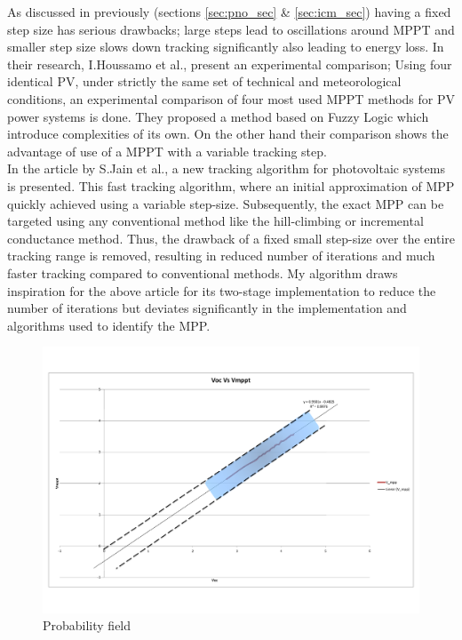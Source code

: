 As discussed in previously (sections \ref{sec:pno_sec} \& \ref{sec:icm_sec}) having a fixed step size has serious drawbacks; large steps lead to oscillations around \ac{MPPT} and smaller step size slows down tracking significantly also leading to energy loss. In their research, I.Houssamo et al.\cite{houssamo2013experimental}, present an experimental comparison; Using four identical PV, under strictly the same set of technical and meteorological conditions, an experimental comparison  of four most used MPPT methods for PV power systems is done. They  proposed a method based on Fuzzy Logic which introduce complexities of its own. On the other hand their comparison shows the advantage of use of a MPPT with a variable tracking step.\\  

In the article by S.Jain et al.\cite{jain2004new}, a new tracking algorithm for photovoltaic systems is presented. This  fast tracking algorithm, where an initial approximation of \ac{MPP} quickly achieved using a variable step-size. Subsequently, the exact \ac{MPP} can be targeted using any conventional method like the hill-climbing or incremental conductance method. Thus, the drawback of a fixed small step-size over the entire tracking range is removed, resulting in reduced number of iterations and much faster tracking compared to conventional methods. My algorithm draws inspiration for the above article for its two-stage implementation to reduce the number of iterations but deviates significantly in the implementation and algorithms used to identify the \ac{MPP}.\\ 
 

\begin{figure}[H]
  \begin{center}
	  \includegraphics[width=1.1\textwidth]{images/Probability_field}
	  \caption{Probability field }
	  \label{fig:Probability_field}
  \end{center}
\end{figure}

